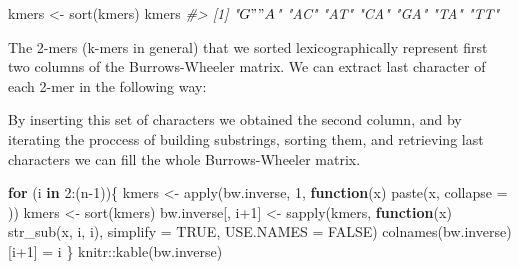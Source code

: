 \documentclass[
]{book}
\newenvironment{Shaded}{\begin{snugshade}}{\end{snugshade}}
\newcommand{\AttributeTok}[1]{\textcolor[rgb]{0.77,0.63,0.00}{#1}}
\newcommand{\CommentTok}[1]{\textcolor[rgb]{0.56,0.35,0.01}{\textit{#1}}}
\newcommand{\ConstantTok}[1]{\textcolor[rgb]{0.00,0.00,0.00}{#1}}
\newcommand{\ControlFlowTok}[1]{\textcolor[rgb]{0.13,0.29,0.53}{\textbf{#1}}}
\newcommand{\DecValTok}[1]{\textcolor[rgb]{0.00,0.00,0.81}{#1}}
\newcommand{\FunctionTok}[1]{\textcolor[rgb]{0.00,0.00,0.00}{#1}}
\newcommand{\NormalTok}[1]{#1}
\newcommand{\OtherTok}[1]{\textcolor[rgb]{0.56,0.35,0.01}{#1}}
\newcommand{\SpecialCharTok}[1]{\textcolor[rgb]{0.00,0.00,0.00}{#1}}
\newcommand{\StringTok}[1]{\textcolor[rgb]{0.31,0.60,0.02}{#1}}
\begin{document}
\begin{Shaded}
\begin{Highlighting}[numbers=left,,]
\NormalTok{kmers }\OtherTok{\textless{}{-}} \FunctionTok{sort}\NormalTok{(kmers)}
\NormalTok{kmers}
\CommentTok{\#\textgreater{} [1] "$G" "A$" "AC" "AT" "CA" "GA" "TA" "TT"}
\end{Highlighting}
\end{Shaded}

The 2-mers (k-mers in general) that we sorted lexicographically represent first two columns of the Burrows-Wheeler matrix. We can extract last character of each 2-mer in the following way:

\begin{Shaded}
\end{Shaded}

By inserting this set of characters we obtained the second column, and by iterating the proccess of building substrings, sorting them, and retrieving last characters we can fill the whole Burrows-Wheeler matrix.

\begin{Shaded}
\begin{Highlighting}[numbers=left,,]
\ControlFlowTok{for}\NormalTok{ (i }\ControlFlowTok{in} \DecValTok{2}\SpecialCharTok{:}\NormalTok{(n}\DecValTok{{-}1}\NormalTok{))\{}
\NormalTok{  kmers             }\OtherTok{\textless{}{-}} \FunctionTok{apply}\NormalTok{(bw.inverse, }\DecValTok{1}\NormalTok{, }
                             \ControlFlowTok{function}\NormalTok{(x) }\FunctionTok{paste}\NormalTok{(x, }\AttributeTok{collapse =} \StringTok{\textquotesingle{}\textquotesingle{}}\NormalTok{))}
\NormalTok{  kmers             }\OtherTok{\textless{}{-}} \FunctionTok{sort}\NormalTok{(kmers)}
\NormalTok{  bw.inverse[, i}\SpecialCharTok{+}\DecValTok{1}\NormalTok{] }\OtherTok{\textless{}{-}} \FunctionTok{sapply}\NormalTok{(kmers, }\ControlFlowTok{function}\NormalTok{(x) }\FunctionTok{str\_sub}\NormalTok{(x, i, i), }
                              \AttributeTok{simplify =} \ConstantTok{TRUE}\NormalTok{, }\AttributeTok{USE.NAMES =} \ConstantTok{FALSE}\NormalTok{)}
  \FunctionTok{colnames}\NormalTok{(bw.inverse)[i}\SpecialCharTok{+}\DecValTok{1}\NormalTok{] }\OtherTok{=}\NormalTok{ i}
\NormalTok{\}}
\NormalTok{knitr}\SpecialCharTok{::}\FunctionTok{kable}\NormalTok{(bw.inverse)}
\end{Highlighting}
\end{Shaded}
\end{document}
